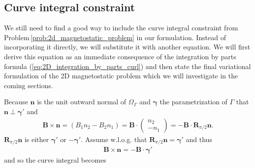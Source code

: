 \documentclass[../master_thesis.tex]{subfiles}
\begin{document}
\subsection{Curve integral constraint}\label{sec:curve_integral_constraint}

We still need to find a good way to include the curve integral constraint from 
Problem\,\ref{prob:2d_magnetostatic_problem} in our formulation. Instead of incorporating 
it directly, we will substitute it with another equation. We will first derive this 
equation as an immediate consequence of the integration by parts formula 
(\ref{eq:2D_integration_by_parts_curl}) and then state the 
final variational formulation of the 2D magnetostatic problem which we 
will investigate in the coming sections.

Because $\mathbf{n}$ is the unit outward normal 
of $\Omega_\Gamma$ and $\bm{\gamma}$ the parametrization of $\Gamma$ that $\mathbf{n} \perp \bm{\gamma}'$
and
\begin{align*}
    \mathbf{B}\times \mathbf{n} 
    = (B_1 n_2 - B_2 n_1) = \mathbf{B} \cdot \begin{pmatrix}n_2 \\ -n_1 \end{pmatrix}
    = -\mathbf{B} \cdot \mathbf{R}_{\pi/2}\mathbf{n}.
\end{align*}
$\mathbf{R}_{\pi/2} \mathbf{n}$ is either $\bm{\gamma}'$ or $-\bm{\gamma}'$. Assume w.l.o.g.
that $\mathbf{R}_{\pi/2} \mathbf{n} = \bm{\gamma}'$ and thus 
\begin{align*}
    \mathbf{B} \times \mathbf{n} = -\mathbf{B} \cdot \bm{\gamma}'
\end{align*}
and so the curve integral becomes
\end{document}
